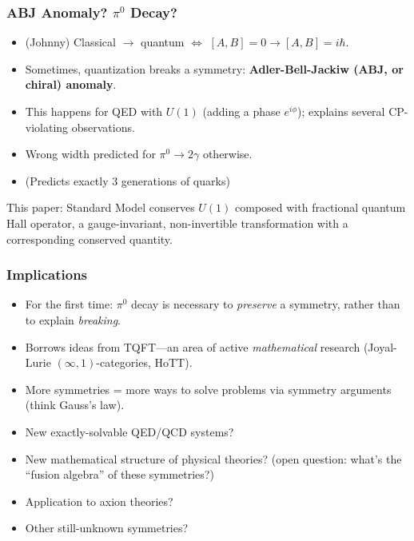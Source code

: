 \documentclass[10pt]{beamer}
\begin{document}
\begin{frame}
  \frametitle{ABJ Anomaly? $\pi^{0}$ Decay?}

  \begin{itemize}
  \item (Johnny) Classical $\to$ quantum $\Leftrightarrow$ $[A, B] = 0 \to [A, B] = i\hbar$.
  \item Sometimes, quantization breaks a symmetry: \textbf{Adler-Bell-Jackiw (ABJ, or chiral) anomaly}.
  \item This happens for QED with $U(1)$ (adding a phase $e^{i\phi}$); explains several CP-violating observations.
  \item Wrong width predicted for $\pi^{0} \to 2\gamma$ otherwise.
  \item (Predicts exactly 3 generations of quarks)
  \end{itemize}
  This paper: Standard Model conserves $U(1)$ composed with fractional quantum Hall operator,
  a gauge-invariant, non-invertible transformation with a corresponding conserved quantity.
\end{frame}

\begin{frame}
  \frametitle{Implications}

  \begin{itemize}
  \item For the first time: $\pi^{0}$ decay is necessary to \textit{preserve} a symmetry, rather than to explain \textit{breaking}.
  \item Borrows ideas from TQFT---an area of active \textit{mathematical} research (Joyal-Lurie $(\infty, 1)$-categories, HoTT).
  \item More symmetries = more ways to solve problems via symmetry arguments (think Gauss's law).
  \item New exactly-solvable QED/QCD systems?
  \item New mathematical structure of physical theories? (open question: what's the ``fusion algebra'' of these symmetries?)
  \item Application to axion theories?
  \item Other still-unknown symmetries?
  \end{itemize}
\end{frame}
\end{document}
